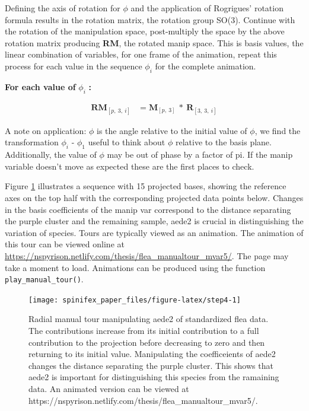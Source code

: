 Defining the axis of rotation for \(\phi\) and the application of
Rogrigues' rotation formula results in the rotation matrix, the rotation
group SO(3). Continue with the rotation of the manipulation space,
post-multiply the space by the above rotation matrix producing
\textbf{RM}, the rotated manip space. This is basis values, the linear
combination of variables, for one frame of the animation, repeat this
process for each value in the sequence \(\phi_i\) for the complete
animation.

\textbf{For each value of } \(\phi_i\) \textbf{:}

\begin{align*}
  \textbf{RM}_{[p,~3,~i]} &= \textbf{M}_{[p,~3]} ~*~ \textbf{R}_{[3,~3,~i]} 
\end{align*}

A note on application: \(\phi\) is the angle relative to the initial
value of \(\phi\), we find the transformation \(\phi_i\) - \(\phi_1\)
useful to think about \(\phi\) relative to the basis plane.
Additionally, the value of \(\phi\) may be out of phase by a factor of
pi. If the manip variable doesn't move as expected these are the first
places to check.

Figure \ref{fig:step4} illustrates a sequence with 15 projected bases,
showing the reference axes on the top half with the corresponding
projected data points below. Changes in the basis coefficients of the
manip var correspond to the distance separating the purple cluster and
the remaining sample, aede2 is crucial in distinguishing the variation
of species. Tours are typically viewed as an animation. The animation of
this tour can be viewed online at
\url{https://nspyrison.netlify.com/thesis/flea_manualtour_mvar5/}. The
page may take a moment to load. Animations can be produced using the
function \texttt{play\_manual\_tour()}.

\begin{Schunk}
\begin{figure}

{\centering \texttt{[image: spinifex\_paper\_files/figure-latex/step4-1]} 

}

\caption[Radial manual tour manipulating aede2 of standardized flea data]{Radial manual tour manipulating aede2 of standardized flea data.  The contributions increase from its initial contribution to a full contribution to the projection before decreasing to zero and then returning to its initial value. Manipulating the coefficeients of aede2 changes the distance separating the purple cluster. This shows that aede2 is important for distinguishing this species from the ramaining data. An animated version can be viewed at  https://nspyrison.netlify.com/thesis/flea\_manualtour\_mvar5/.}\label{fig:step4}
\end{figure}
\end{Schunk}

